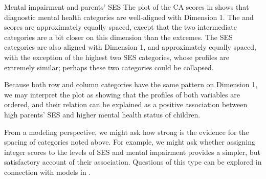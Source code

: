 \documentclass[11pt]{book}
\begin{document}
\begin{Example}[mental3]{Mental impairment and parents' SES}
The plot of the CA scores in  shows that
diagnostic mental health categories are well-aligned with Dimension 1.  The
and scores are approximately equally spaced, except that
the two intermediate categories are a bit closer on this dimension than
the extremes.  The
SES categories are also aligned with Dimension 1, and approximately
equally spaced, with the exception of the highest two SES categories,
whose profiles are extremely similar;
perhaps these two categories could be collapsed.

Because both row and column categories have the same pattern on
Dimension 1, we may interpret the plot as showing that the profiles
of both variables are ordered, and their relation can be explained
as a positive association between high parents' SES and higher mental
health status of children. 

From a modeling perspective,  we might ask how strong is the evidence
for the spacing of categories noted above.  For example, we might
ask whether assigning integer scores to the levels of SES and mental
impairment provides a simpler, but satisfactory account of their association.
Questions of this type can be explored in connection with \loglin models in
. 

\end{Example}
\end{document}
